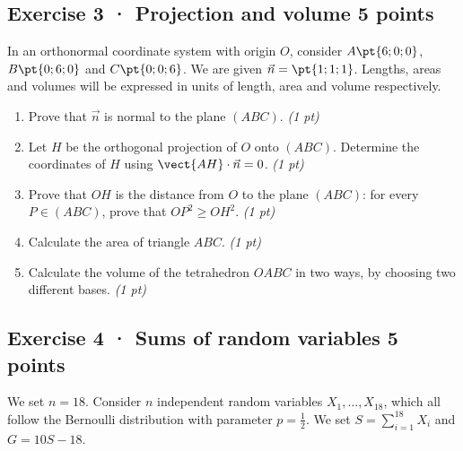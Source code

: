 \mxnewpage{}

\subsection*{Exercise 3 · Projection and volume \hfill 5 points}In an orthonormal coordinate system with origin $O$, consider $A\pt{6;0;0}$, $B\pt{0;6;0}$ and $C\pt{0;0;6}$. We are given $\vec n=\pt{1;1;1}$. Lengths, areas and volumes will be expressed in units of length, area and volume respectively.

\begin{enumerate}

\item Prove that $\vec n$ is normal to the plane $(ABC)$. \hfill\textit{(1 pt)}

\item Let $H$ be the orthogonal projection of $O$ onto $(ABC)$. Determine the coordinates of $H$ using $\vect{AH}\cdot\vec n=0$. \hfill\textit{(1 pt)}

\item Prove that $OH$ is the distance from $O$ to the plane $(ABC)$: for every $P\in(ABC)$, prove that $OP^2\ge OH^2$. \hfill\textit{(1 pt)}

\item Calculate the area of triangle $ABC$. \hfill\textit{(1 pt)}

\item Calculate the volume of the tetrahedron $OABC$ in two ways, by choosing two different bases. \hfill\textit{(1 pt)}

\end{enumerate}

\subsection*{Exercise 4 · Sums of random variables \hfill 5 points}We set $n=18$. Consider $n$ independent random variables $X_1,\ldots,X_{18}$, which all follow the Bernoulli distribution with parameter $p=\frac{1}{2}$. We set $S=\displaystyle\sum_{i=1}^{18}X_i$ and $G=10S-18$.

